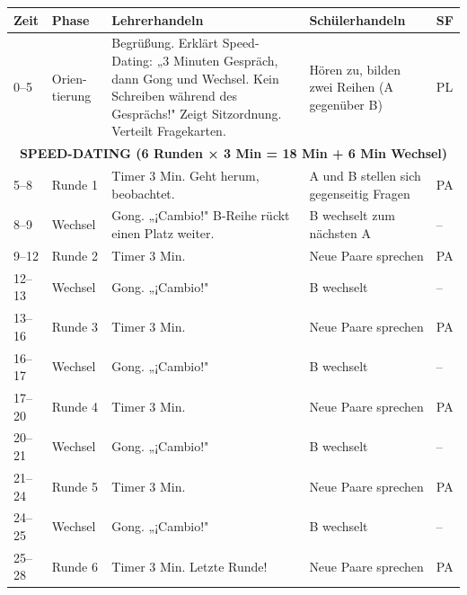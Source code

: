 \documentclass[11pt, a4paper]{article}
\begin{document}
\begin{longtable}{|p{1.2cm}|p{2cm}|p{4cm}|p{3.5cm}|p{1.5cm}|}
    \hline
    \textbf{Zeit} & \textbf{Phase} & \textbf{Lehrerhandeln} & \textbf{Schülerhandeln} & \textbf{SF} \\
    \hline
    \endfirsthead

    0--5 & Orien-tierung & Begrüßung. Erklärt Speed-Dating: „3 Minuten Gespräch, dann Gong und Wechsel. Kein Schreiben während des Gesprächs!" Zeigt Sitzordnung. Verteilt Fragekarten. & Hören zu, bilden zwei Reihen (A gegenüber B) & PL \\
    \hline

    \multicolumn{5}{|c|}{\cellcolor{hellgrau}\textbf{SPEED-DATING (6 Runden × 3 Min = 18 Min + 6 Min Wechsel)}} \\
    \hline

    5--8 & Runde 1 & Timer 3 Min. Geht herum, beobachtet. & A und B stellen sich gegenseitig Fragen & PA \\
    \hline

    8--9 & Wechsel & Gong. „¡Cambio!" B-Reihe rückt einen Platz weiter. & B wechselt zum nächsten A & -- \\
    \hline

    9--12 & Runde 2 & Timer 3 Min. & Neue Paare sprechen & PA \\
    \hline

    12--13 & Wechsel & Gong. „¡Cambio!" & B wechselt & -- \\
    \hline

    13--16 & Runde 3 & Timer 3 Min. & Neue Paare sprechen & PA \\
    \hline

    16--17 & Wechsel & Gong. „¡Cambio!" & B wechselt & -- \\
    \hline

    17--20 & Runde 4 & Timer 3 Min. & Neue Paare sprechen & PA \\
    \hline

    20--21 & Wechsel & Gong. „¡Cambio!" & B wechselt & -- \\
    \hline

    21--24 & Runde 5 & Timer 3 Min. & Neue Paare sprechen & PA \\
    \hline

    24--25 & Wechsel & Gong. „¡Cambio!" & B wechselt & -- \\
    \hline

    25--28 & Runde 6 & Timer 3 Min. Letzte Runde! & Neue Paare sprechen & PA \\
    \hline


\end{longtable}
\end{document}
